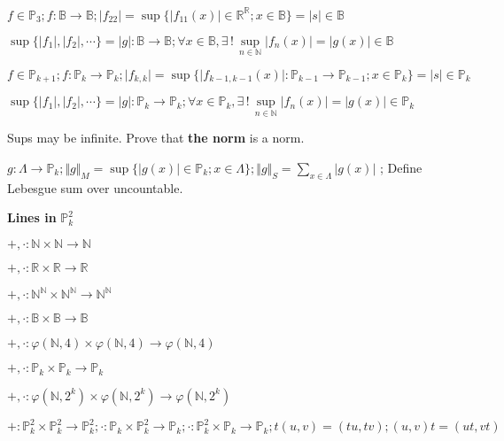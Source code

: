 \documentclass[10pt,a4paper]{article}
\begin{document}
$f \in \mathbb{P}_3 ; f : \mathbb{B} \rightarrow \mathbb{B} ; \vert f_{22} \vert = \sup \{ \vert f_{11}(x) \vert \in \mathbb{R}^\mathbb{R} ; x \in \mathbb{B} \} = \vert s \vert \in \mathbb{B}$

$\sup \{ \vert f_1 \vert, \vert f_2 \vert, \cdots \} = \vert g \vert : \mathbb{B} \rightarrow \mathbb{B} ; \forall x \in \mathbb{B}, \exists \, ! \, \underset{n \in \mathbb{N}}{\sup} \vert f_n(x) \vert = \vert g(x) \vert \in \mathbb{B}$

$f \in \mathbb{P}_{k+1} ; f : \mathbb{P}_k \rightarrow \mathbb{P}_k ; \vert f_{k, k} \vert = \sup \{ \vert f_{k-1, k-1}(x) \vert : \mathbb{P}_{k-1} \rightarrow \mathbb{P}_{k-1} ; x \in \mathbb{P}_k \} = \vert s \vert \in \mathbb{P}_k$

$\sup \{ \vert f_1 \vert, \vert f_2 \vert, \cdots \} = \vert g \vert : \mathbb{P}_k \rightarrow \mathbb{P}_k ; \forall x \in \mathbb{P}_k, \exists \, ! \, \underset{n \in \mathbb{N}}{\sup} \vert f_n(x) \vert = \vert g(x) \vert \in \mathbb{P}_k$

Sups may be infinite. Prove that \textbf{the norm} is a norm.



$g : \Lambda \rightarrow \mathbb{P}_k ; \Vert g \Vert_M = \sup \{ \vert g(x) \vert \in \mathbb{P}_k ; x \in \Lambda \} ; \Vert g \Vert_S = \sum\limits_{x \in \Lambda} \vert g(x) \vert$ ; Define Lebesgue sum over uncountable.

\vspace{3mm}

\textbf{Lines in }$\mathbb{P}_k^2$

$+, \cdot : \mathbb{N} \times \mathbb{N} \rightarrow \mathbb{N}$

$+, \cdot : \mathbb{R} \times \mathbb{R} \rightarrow \mathbb{R}$

$+, \cdot : \mathbb{N}^\mathbb{N} \times \mathbb{N}^\mathbb{N} \rightarrow \mathbb{N}^\mathbb{N}$

$+, \cdot : \mathbb{B} \times \mathbb{B} \rightarrow \mathbb{B}$

$+, \cdot : \varphi(\mathbb{N}, 4) \times \varphi(\mathbb{N}, 4) \rightarrow \varphi(\mathbb{N}, 4)$

$+, \cdot : \mathbb{P}_k \times \mathbb{P}_k \rightarrow \mathbb{P}_k$

$+, \cdot : \varphi(\mathbb{N}, 2^k) \times \varphi(\mathbb{N}, 2^k) \rightarrow \varphi(\mathbb{N}, 2^k)$

$+ : \mathbb{P}_k^2 \times \mathbb{P}_k^2 \rightarrow \mathbb{P}_k^2 ; \cdot : \mathbb{P}_k \times \mathbb{P}_k^2 \rightarrow \mathbb{P}_k ; \cdot : \mathbb{P}_k^2 \times \mathbb{P}_k \rightarrow \mathbb{P}_k ; t (u, v) = (tu, tv) ; (u, v) t = (ut, vt)$
\end{document}
